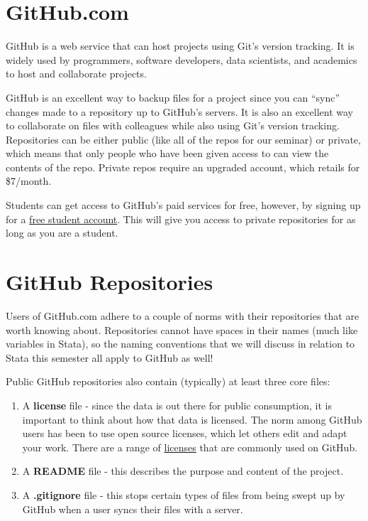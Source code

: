 \documentclass[]{book}
\begin{document}
\section{GitHub.com}\label{github.com}

GitHub is a web service that can host projects using Git's version
tracking. It is widely used by programmers, software developers, data
scientists, and academics to host and collaborate projects.

GitHub is an excellent way to backup files for a project since you can
``sync'' changes made to a repository up to GitHub's servers. It is also
an excellent way to collaborate on files with colleagues while also
using Git's version tracking. Repositories can be either public (like
all of the repos for our seminar) or private, which means that only
people who have been given access to can view the contents of the repo.
Private repos require an upgraded account, which retails for \$7/month.

Students can get access to GitHub's paid services for free, however, by
signing up for a \href{https://education.github.com}{free student
account}. This will give you access to private repositories for as long
as you are a student.

\section{GitHub Repositories}\label{github-repositories}

Users of GitHub.com adhere to a couple of norms with their repositories
that are worth knowing about. Repositories cannot have spaces in their
names (much like variables in Stata), so the naming conventions that we
will discuss in relation to Stata this semester all apply to GitHub as
well!

Public GitHub repositories also contain (typically) at least three core
files:

\begin{enumerate}
\def\labelenumi{\arabic{enumi}.}
\item
  A \textbf{license} file - since the data is out there for public
  consumption, it is important to think about how that data is licensed.
  The norm among GitHub users has been to use open source licenses,
  which let others edit and adapt your work. There are a range of
  \href{http://choosealicense.com}{licenses} that are commonly used on
  GitHub.
\item
  A \textbf{README} file - this describes the purpose and content of the
  project.
\item
  A \textbf{.gitignore} file - this stops certain types of files from
  being swept up by GitHub when a user syncs their files with a server.
\end{enumerate}
\end{document}

